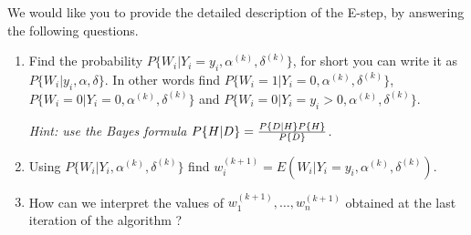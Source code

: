 \documentclass[a4paper,12pt]{article}
\begin{document}
We would like you to provide the detailed description of the E-step, by 
answering the following
questions.
\begin{enumerate}
 \item[b)] Find the probability $P\{W_i|Y_i=y_i, \alpha^{(k)}, 
\delta^{(k)}\}$, for short
you can write it as $P\{W_i|y_i, \alpha, \delta\}$. In other words find
$P\{W_i=1|Y_i=0, \alpha^{(k)}, \delta^{(k)}\}$, $P\{W_i=0|Y_i=0,
\alpha^{(k)}, \delta^{(k)}\}$ and $P\{W_i=0|Y_i=y_i>0, \alpha^{(k)},
\delta^{(k)}\}$.

\noindent\textit{Hint: use the Bayes formula $P\{H|D\}={P\{D|H\} P\{H\}\over
P\{D\}}$.}
  \item[c)] Using $P\{W_i|Y_i, \alpha^{(k)}, \delta^{(k)}\}$ find
$w_i^{(k+1)}=E(W_i|Y_i=y_i,\alpha^{(k)}, \delta^{(k)})$.

 \item[d)] How can we interpret the values of $w_1^{(k+1)}, \ldots,
w_n^{(k+1)}$ obtained at the last iteration of the algorithm ?


 \end{enumerate}
%

%
%
\end{document}
